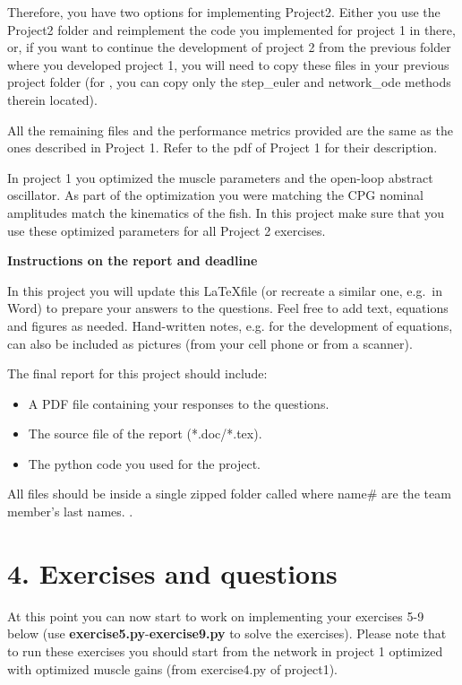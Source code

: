 \documentclass{cmc}
\begin{document}
Therefore, you have two options for implementing Project2. Either you use the Project2 folder and reimplement the code you implemented for project 1 in there, or, if you want to continue the development of project 2 from the previous folder where you developed project 1, you will need to copy these files in your previous project folder (for , you can copy only the step\_euler and network\_ode methods therein located).

All the remaining files and the performance metrics provided are the same as the ones described in Project 1. Refer to the pdf of Project 1 for their description.

In project 1 you optimized the muscle parameters and the open-loop abstract oscillator. As part of the optimization you were matching the CPG nominal amplitudes match the kinematics of the fish. In this project make sure that you use these optimized parameters for all Project 2 exercises.


\textbf{Instructions on the report and deadline}

In this project you will update this \LaTeX \space file (or recreate a similar one, e.g.\ in Word) to prepare your answers to the questions. Feel free to add text, equations and figures as needed. Hand-written notes, e.g. for the development of equations, can also be included as pictures (from your cell phone or from a scanner).

The final report for this project should include:

\begin{itemize}
    \item A PDF file containing your responses to the questions.
    \item The source file of the report (*.doc/*.tex).
    \item The python code you used for the project.
\end{itemize}

All files should be inside a single zipped folder called  where name\# are the team member's last names. .

\textit{
  \textbf{}
}

\section*{4. Exercises and questions}
At this point you can now start to work on implementing your exercises 5-9 below (use \textbf{exercise5.py}-\textbf{exercise9.py} to solve the exercises). Please note that to run these exercises you should start from the network in project 1 optimized with optimized muscle gains (from exercise4.py of project1).
\end{document}
